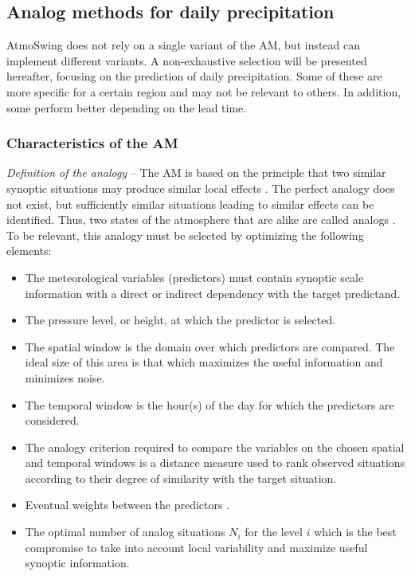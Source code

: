 \documentclass[gmd]{copernicus}
\begin{document}
\subsection{Analog methods for daily precipitation}
\label{sec:method}

AtmoSwing does not rely on a single variant of the AM, but instead can implement different variants. A non-exhaustive selection will be presented hereafter, focusing on the prediction of daily precipitation. Some of these are more specific for a certain region and may not be relevant to others. In addition, some perform better depending on the lead time.


\subsubsection{Characteristics of the AM}

\textit{Definition of the analogy} -- The AM is based on the principle that two similar synoptic situations may produce similar local effects \citep{Lorenz1956}. The perfect analogy does not exist, but sufficiently similar situations leading to similar effects can be identified. Thus, two states of the atmosphere that are alike are called analogs \citep{Lorenz1969}. To be relevant, this analogy must be selected by optimizing the following elements:

\begin{itemize}		
	\item The meteorological variables (predictors) must contain synoptic scale information with a direct or indirect dependency with the target predictand.
	\item The pressure level, or height, at which the predictor is selected.
	\item The spatial window is the domain over which predictors are compared. The ideal size of this area is that which maximizes the useful information and minimizes noise.
	\item The temporal window is the hour(s) of the day for which the predictors are considered.
	\item The analogy criterion required to compare the variables on the chosen spatial and temporal windows is a distance measure used to rank observed situations according to their degree of similarity with the target situation.
	\item Eventual weights between the predictors \cite[e.g.,][]{Horton2017b, Junk2015}.
	\item The optimal number of analog situations $N_{i}$ for the level $i$ which is the best compromise to take into account local variability and maximize useful synoptic information.
\end{itemize}
\end{document}
